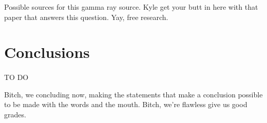 \documentclass[a4paper, titlepage, oneside]{article}
\begin{document}
\begin{multicols}{2}
Possible sources for this gamma ray source. Kyle get your butt in here with that paper that answers this question. Yay, free research.

\section{Conclusions}
\paragraph{}
TO DO

Bitch, we concluding now, making the statements that make a conclusion possible to be made with the words and the mouth. Bitch, we're flawless give us good grades.
\end{multicols}

\printbibliography[heading = bibintoc] %

\newpage
\end{document}
